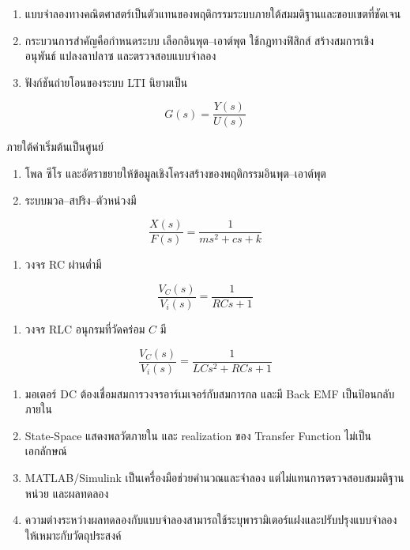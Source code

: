 \begin{enumerate}
    \item แบบจำลองทางคณิตศาสตร์เป็นตัวแทนของพฤติกรรมระบบภายใต้สมมติฐานและขอบเขตที่ชัดเจน
    \item กระบวนการสำคัญคือกำหนดระบบ เลือกอินพุต–เอาต์พุต ใช้กฎทางฟิสิกส์ สร้างสมการเชิงอนุพันธ์ แปลงลาปลาซ และตรวจสอบแบบจำลอง
    \item ฟังก์ชันถ่ายโอนของระบบ LTI นิยามเป็น
\end{enumerate}

\[
G(s)=\frac{Y(s)}{U(s)}
\]

ภายใต้ค่าเริ่มต้นเป็นศูนย์

\begin{enumerate}
    \item โพล ซีโร และอัตราขยายให้ข้อมูลเชิงโครงสร้างของพฤติกรรมอินพุต–เอาต์พุต
    \item ระบบมวล–สปริง–ตัวหน่วงมี
\end{enumerate}

\[
\frac{X(s)}{F(s)}=\frac{1}{ms^2+cs+k}
\]

\begin{enumerate}
    \item วงจร RC ผ่านต่ำมี
\end{enumerate}

\[
\frac{V_C(s)}{V_i(s)}=\frac{1}{RCs+1}
\]

\begin{enumerate}
    \item วงจร RLC อนุกรมที่วัดคร่อม $C$ มี
\end{enumerate}

\[
\frac{V_C(s)}{V_i(s)}=\frac{1}{LCs^2+RCs+1}
\]

\begin{enumerate}
    \item มอเตอร์ DC ต้องเชื่อมสมการวงจรอาร์เมเจอร์กับสมการกล และมี Back EMF เป็นป้อนกลับภายใน
    \item State-Space แสดงพลวัตภายใน และ realization ของ Transfer Function ไม่เป็นเอกลักษณ์
    \item MATLAB/Simulink เป็นเครื่องมือช่วยคำนวณและจำลอง แต่ไม่แทนการตรวจสอบสมมติฐาน หน่วย และผลทดลอง
    \item ความต่างระหว่างผลทดลองกับแบบจำลองสามารถใช้ระบุพารามิเตอร์แฝงและปรับปรุงแบบจำลองให้เหมาะกับวัตถุประสงค์
\end{enumerate}


